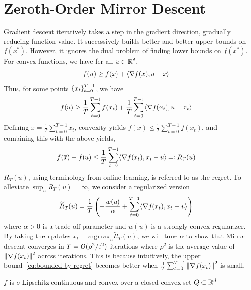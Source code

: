 
\chapter{Zeroth-Order Mirror Descent}
\label{chap:zo-mirror-descent}

    Gradient descent iteratively takes a step in the gradient direction, gradually reducing function value. It successively builds better and better upper bounds on $f(x^*)$. However, it ignores the dual problem of finding lower bounds on $f(x^*)$. For convex functions, we have for all $u \in \mathbb{R}^d$,
    \begin{align*}
        f(u) \geq f(x) + \langle \nabla f(x), u - x \rangle
    \end{align*}
    Thus, for some points $\left\{x_t\right\}_{t=0}^{T-1}$, we have
    \begin{align}
        \label{eq:bounded-by-regret}
        f(u) \geq \frac 1T \sum_{t=0}^{T-1} f(x_t) + \frac{1}{T} \sum_{t=0}^{T-1} \langle \nabla f(x_t), u - x_t \rangle
    \end{align}
    Defining $\overline x = \frac{1}{T} \sum_{t=0}^{T-1} x_t$, convexity yields $f(\overline x) \leq \frac{1}{T} \sum_{t=0}^{T-1} f(x_t)$, and combining this with the above yields,
    \begin{align*}
        f(\overline x) - f(u) \leq \frac{1}{T} \sum_{t=0}^{T-1} \langle \nabla f(x_t), x_t - u \rangle \eqqcolon R_T(u)
    \end{align*}
    $R_T(u)$, using terminology from online learning, is referred to as the regret. To alleviate $\sup_u R_T(u) = \infty$, we consider a regularized version 
    \begin{align*}
        \widetilde R_T(u) = \frac{1}{T} \left(-\frac{w(u)}{\alpha} + \sum_{t=0}^{T-1} \langle \nabla f(x_t), x_t - u \rangle \right)
    \end{align*}
    where $\alpha > 0$ is a trade-off parameter and $w(u)$ is a strongly convex regularizer. By taking the updates $x_t = \mathrm{argmax}_u \widetilde R_T(u)$, we will tune $\alpha$ to show that Mirror descent converges in $T=O(\rho^2 / \varepsilon^2)$ iterations where $\rho^2$ is the average value of $\left\lVert \nabla f(x_t) \right\rVert^2$ across iterations. This is because intuitively, the upper bound~\eqref{eq:bounded-by-regret} becomes better when $\frac{1}{T} \sum_{t=0}^{T-1} \left\lVert \nabla f(x_t) \right\rVert^2$ is small. 

    \begin{assumption}
        $f$ is $\rho$-Lipschitz continuous and convex over a closed convex set $Q \subset \mathbb{R}^d$.
    \end{assumption}

